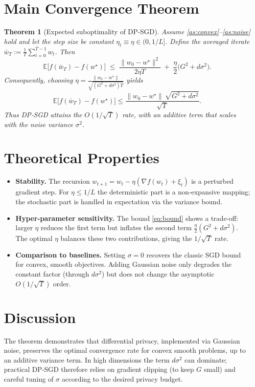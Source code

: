 \documentclass{article}
\newtheorem{theorem}{Theorem}
\newcommand{\E}{\mathbb{E}}
\begin{document}
\section*{Main Convergence Theorem}
\begin{theorem}[Expected suboptimality of DP‑SGD]\label{thm:main}
Assume \ref{as:convex}–\ref{as:noise} hold and let the step size be constant $\eta_t\equiv\eta\in(0,1/L]$.  Define the averaged iterate $\bar w_T:=\frac1T\sum_{t=0}^{T-1}w_t$.  Then
\begin{equation}\label{eq:bound}
\E\!\big[ f(\bar w_T)-f(w^\star)\big]\;\le\;
\frac{\|w_0-w^\star\|^2}{2\eta T}
\;+\;
\frac{\eta}{2}\big(G^2+d\sigma^2\big).
\end{equation}
Consequently, choosing $\displaystyle\eta=\frac{\|w_0-w^\star\|}{\sqrt{(G^2+d\sigma^2)T}}$ yields
\[
\E\!\big[ f(\bar w_T)-f(w^\star)\big]\le
\frac{\|w_0-w^\star\|\,\sqrt{G^2+d\sigma^2}}{\sqrt{T}}.
\]
Thus DP‑SGD attains the $O(1/\sqrt{T})$ rate, with an additive term that scales with the noise variance $\sigma^2$.
\end{theorem}

\section*{Theoretical Properties}
\begin{itemize}
\item \textbf{Stability.}  The recursion $w_{t+1}=w_t-\eta(\nabla f(w_t)+\xi_t)$ is a perturbed gradient step.  For $\eta\le 1/L$ the deterministic part is a non‑expansive mapping; the stochastic part is handled in expectation via the variance bound.
\item \textbf{Hyper‑parameter sensitivity.}  The bound \eqref{eq:bound} shows a trade‑off: larger $\eta$ reduces the first term but inflates the second term $\frac{\eta}{2}(G^2+d\sigma^2)$.  The optimal $\eta$ balances these two contributions, giving the $1/\sqrt{T}$ rate.
\item \textbf{Comparison to baselines.}  Setting $\sigma=0$ recovers the classic SGD bound for convex, smooth objectives.  Adding Gaussian noise only degrades the constant factor (through $d\sigma^2$) but does not change the asymptotic $O(1/\sqrt{T})$ order.
\end{itemize}

\section*{Discussion}
The theorem demonstrates that differential privacy, implemented via Gaussian noise, preserves the optimal convergence rate for convex smooth problems, up to an additive variance term.  In high dimensions the term $d\sigma^2$ can dominate; practical DP‑SGD therefore relies on gradient clipping (to keep $G$ small) and careful tuning of $\sigma$ according to the desired privacy budget.
\end{document}
